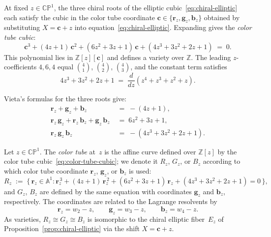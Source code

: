 \begin{remark}
\label{rem:color-tube-cubic}
  At fixed $z \in \mathbb{CP}^1$, the three chiral roots of the
  elliptic cubic~\eqref{eq:chiral-elliptic} each satisfy the cubic in
  the color tube coordinate $\mathbf{c} \in \{\mathbf{r}_z, \mathbf{g}_z, \mathbf{b}_z\}$
  obtained by substituting $X = \mathbf{c} + z$
  into equation~\eqref{eq:chiral-elliptic}.  Expanding gives the
  \emph{color tube cubic}:
  \begin{equation}\label{eq:color-tube-cubic}
    \mathbf{c}^3 + (4z+1)\,\mathbf{c}^2 + (6z^2+3z+1)\,\mathbf{c}
    + (4z^3+3z^2+2z+1) \;=\; 0.
  \end{equation}
  This polynomial lies in $\mathbb{Z}[z][\mathbf{c}]$ and defines a
  variety over $\mathbb{Z}$.  The leading $z$-coefficients $4, 6, 4$
  equal $\binom{4}{1}$, $\binom{4}{2}$, $\binom{4}{3}$, and the
  constant term satisfies
  \[
    4z^3 + 3z^2 + 2z + 1 \;=\; \frac{d}{dz}(z^4 + z^3 + z^2 + z).
  \]

  \medskip
  \noindent Vieta's formulas for the three roots give:
  \begin{align}
    \mathbf{r}_z + \mathbf{g}_z + \mathbf{b}_z
      &\;=\; -(4z+1),
      \label{eq:vieta-sum}\\[4pt]
    \mathbf{r}_z\,\mathbf{g}_z + \mathbf{r}_z\,\mathbf{b}_z
      + \mathbf{g}_z\,\mathbf{b}_z
      &\;=\; 6z^2+3z+1,
      \label{eq:vieta-pairs}\\[4pt]
    \mathbf{r}_z\,\mathbf{g}_z\,\mathbf{b}_z
      &\;=\; -(4z^3+3z^2+2z+1).
      \label{eq:vieta-product}
  \end{align}
\end{remark}

\begin{definition}
\label{def:color-tube-fibers}
  Let $z \in \mathbb{CP}^1$.  The \emph{color tube} at~$z$ is the
  affine curve defined over $\mathbb{Z}[z]$ by the color tube
  cubic~\eqref{eq:color-tube-cubic}; we denote it $R_z$, $G_z$, or
  $B_z$ according to which color tube coordinate $\mathbf{r}_z$,
  $\mathbf{g}_z$, or $\mathbf{b}_z$ is used:
  \begin{equation}\label{eq:color-tube-fiber-def}
    R_z \;:=\;
    \bigl\{\,\mathbf{r}_z \in \mathbb{A}^1 :
      \mathbf{r}_z^{\,3} + (4z+1)\,\mathbf{r}_z^{\,2}
      + (6z^2+3z+1)\,\mathbf{r}_z
      + (4z^3+3z^2+2z+1) = 0\,\bigr\},
  \end{equation}
  and $G_z$, $B_z$ are defined by the same equation with coordinates
  $\mathbf{g}_z$ and $\mathbf{b}_z$, respectively.  The coordinates
  are related to the Lagrange resolvents by
  \[
    \mathbf{r}_z = w_2 - z, \qquad \mathbf{g}_z = w_3 - z, \qquad
    \mathbf{b}_z = w_4 - z.
  \]
  As varieties, $R_z \cong G_z \cong B_z$ is isomorphic to the chiral
  elliptic fiber~$E_z$ of Proposition~\ref{prop:chiral-elliptic} via
  the shift $X = \mathbf{c} + z$.
\end{definition}

